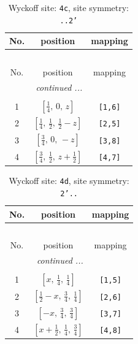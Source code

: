 \documentclass[fleqn,8pt]{jsarticle}
\begin{document}
\renewcommand{\arraystretch}{1.2}
\begin{longtable}{ccc}
\caption{Wyckoff site: {\tt 4c}, site symmetry: {\tt ..2'}}
 \\
 \hline \hline
No. & position & mapping \\ \hline \endfirsthead

\multicolumn{2}{l}{\tablename\ \thetable{}} \\
 \hline \hline
No. & position & mapping \\ \hline \endhead

 \hline \hline
\multicolumn{2}{r}{\footnotesize\it continued ...} \\ \endfoot

 \hline \hline
\multicolumn{2}{r}{} \\ \endlastfoot

1 & $\left[ \frac{1}{4},\, 0,\, z \right]$ & {\tt [1,6]} \\ \hline
2 & $\left[ \frac{1}{4},\, \frac{1}{2},\, \frac{1}{2} - z \right]$ & {\tt [2,5]} \\ \hline
3 & $\left[ \frac{3}{4},\, 0,\, - z \right]$ & {\tt [3,8]} \\ \hline
4 & $\left[ \frac{3}{4},\, \frac{1}{2},\, z + \frac{1}{2} \right]$ & {\tt [4,7]} \\
\end{longtable}
\renewcommand{\arraystretch}{1.2}
\begin{longtable}{ccc}
\caption{Wyckoff site: {\tt 4d}, site symmetry: {\tt 2'..}}
 \\
 \hline \hline
No. & position & mapping \\ \hline \endfirsthead

\multicolumn{2}{l}{\tablename\ \thetable{}} \\
 \hline \hline
No. & position & mapping \\ \hline \endhead

 \hline \hline
\multicolumn{2}{r}{\footnotesize\it continued ...} \\ \endfoot

 \hline \hline
\multicolumn{2}{r}{} \\ \endlastfoot

1 & $\left[ x,\, \frac{1}{4},\, \frac{1}{4} \right]$ & {\tt [1,5]} \\ \hline
2 & $\left[ \frac{1}{2} - x,\, \frac{3}{4},\, \frac{1}{4} \right]$ & {\tt [2,6]} \\ \hline
3 & $\left[ - x,\, \frac{3}{4},\, \frac{3}{4} \right]$ & {\tt [3,7]} \\ \hline
4 & $\left[ x + \frac{1}{2},\, \frac{1}{4},\, \frac{3}{4} \right]$ & {\tt [4,8]} \\
\end{longtable}
\end{document}
